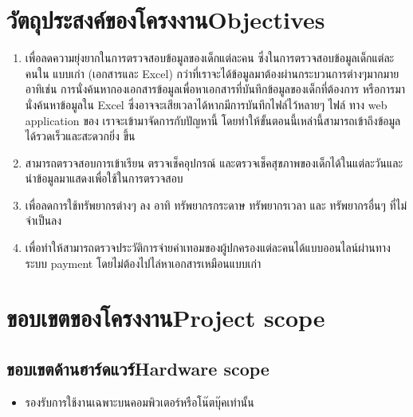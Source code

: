 \section{\ifcpe วัตถุประสงค์ของโครงงาน\else Objectives\fi}
\begin{enumerate}
    \item เพื่อลดความยุ่งยากในการตรวจสอบข้อมูลของเด็กแต่ละคน ซึ่งในการตรวจสอบข้อมูลเด็กแต่ละคนใน แบบเก่า (เอกสารและ Excel) กว่าที่เราจะได้ข้อมูลมาต้องผ่านกระบวนการต่างๆมากมาย อาทิเช่น การนั่งค้นหากองเอกสารข้อมูลเพื่อหาเอกสารที่บันทึกข้อมูลของเด็กที่ต้องการ หรือการมานั่งค้นหาข้อมูลใน Excel ซึ่งอาจจะเสียเวลาได้หากมีการบันทึกไฟล์ไว้หลายๆ ไฟล์ ทาง web application ของ เราจะเข้ามาจัดการกับปัญหานี้ โดยทําให้ขั้นตอนนี้เหล่านี้สามารถเข้าถึงข้อมูลได้รวดเร็วและสะดวกยิ่ง ขึ้น 

    \item สามารถตรวจสอบการเข้าเรียน ตรวจเช็คอุปกรณ์ และตรวจเช็คสุขภาพของเด็กได้ในแต่ละวันและนําข้อมูลมาแสดงเพื่อใช้ในการตรวจสอบ

    \item เพื่อลดการใช้ทรัพยากรต่างๆ ลง อาทิ ทรัพยากรกระดาษ ทรัพยากรเวลา และ ทรัพยากรอื่นๆ ที่ไม่จําเป็นลง
    \item เพื่อทำให้สามารถตรวจประวัติการจ่ายค่าเทอมของผู้ปกครองแต่ละคนได้แบบออนไลน์ผ่านทางระบบ payment โดยไม่ต้องไปไล่หาเอกสารเหมือนแบบเก่า

\end{enumerate}


\section{\ifcpe ขอบเขตของโครงงาน\else Project scope\fi}

\subsection{\ifcpe ขอบเขตด้านฮาร์ดแวร์\else Hardware scope\fi}
\begin{itemize}
    \item รองรับการใช้งานเฉพาะบนคอมพิวเตอร์หรือโน๊ตบุ๊คเท่านั้น

\end{itemize}

